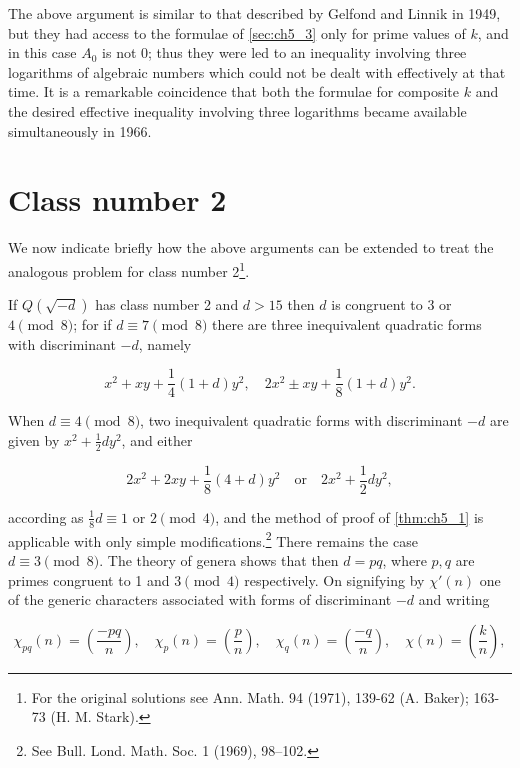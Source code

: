 The above argument is similar to that described by Gelfond and Linnik in 1949, but they had access to the formulae of \autoref{sec:ch5_3} only for prime values of $k$, and in this case $A_0$ is not 0; thus they were led to an inequality involving three logarithms of algebraic numbers which could not be dealt with effectively at that time. It is a remarkable coincidence that both the formulae for composite $k$ and the desired effective inequality involving three logarithms became available simultaneously in 1966.

\section{Class number 2}\label{sec:ch5_5}

We now indicate briefly how the above arguments can be extended to treat the analogous problem for class number 2\footnote{For the original solutions see Ann. Math. 94 (1971), 139-62 (A. Baker); 163-73
(H. M. Stark).}.

If $Q(\sqrt{-d})$ has class number 2 and $d > 15$ then $d$ is congruent to 3 or $4 \pmod 8$; for if $d \equiv 7 \pmod 8$ there are three inequivalent quadratic forms with discriminant $-d$, namely

\[ x^2 + xy + \frac{1}{4}(1+d)y^2, \quad 2x^2 \pm xy + \frac{1}{8}(1+d)y^2. \]

When $d \equiv 4 \pmod 8$, two inequivalent quadratic forms with discriminant $-d$ are given by $x^2 + \frac{1}{2}dy^2$, and either

\[ 2x^2 + 2xy + \frac{1}{8}(4+d)y^2 \quad \text{or} \quad 2x^2 + \frac{1}{2}dy^2, \]

according as $\frac{1}{8}d \equiv 1$ or $2 \pmod 4$, and the method of proof of \autoref{thm:ch5_1} is applicable with only simple modifications.\footnote{See Bull. Lond. Math. Soc. 1 (1969), 98--102.} There remains the case $d \equiv 3 \pmod 8$. The theory of genera shows that then $d = pq$, where $p, q$ are primes congruent to 1 and $3 \pmod 4$ respectively. On signifying by $\chi'(n)$ one of the generic characters associated with forms of discriminant $-d$ and writing

\[\chi_{pq}(n) = \left(\frac{-pq}{n}\right), \quad \chi_p(n) = \left(\frac{p}{n}\right), \quad \chi_q(n) = \left(\frac{-q}{n}\right), \quad \chi(n) = \left(\frac{k}{n}\right),\]

